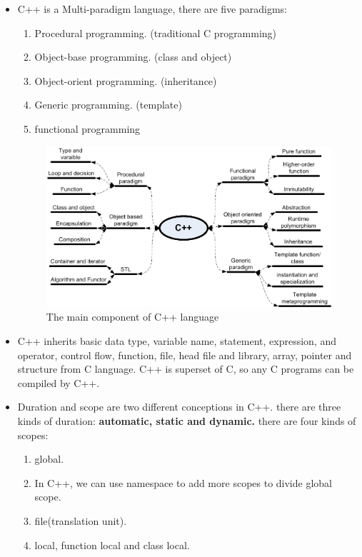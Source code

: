 \documentclass[a4paper,11pt,twoside]{book}
\begin{document}
\begin{itemize}
    \item C++ is a Multi-paradigm language, there are five paradigms: 
    
    \begin{enumerate}
        \item Procedural programming. (traditional C programming)
        \item Object-base programming. (class and object)
        \item Object-orient programming. (inheritance)
        \item Generic programming. (template)
        \item functional programming
    \end{enumerate}

\begin{figure}[h]
	\centering
	\includegraphics[width=0.85\linewidth]{pics/whole.png}
	\caption{The main component of C++ language}
	\label{fig:whole}
\end{figure}

     \item C++ inherits basic data type, variable name, statement, expression, and operator, control flow, function, file, head file and library, array, pointer and structure from C language. C++ is superset of C, so any C programs can be compiled by C++.
    
    \item Duration and scope are two different conceptions in C++. there are three kinds of duration: \textbf{automatic, static and dynamic.} there are four kinds of scopes:
    \begin{enumerate}
        \item global.
        \item In C++, we can use namespace to add more scopes to divide global scope.
        \item file(translation unit).
        \item local, function local and class local. 
    \end{enumerate}
    

\end{itemize}
\end{document}
